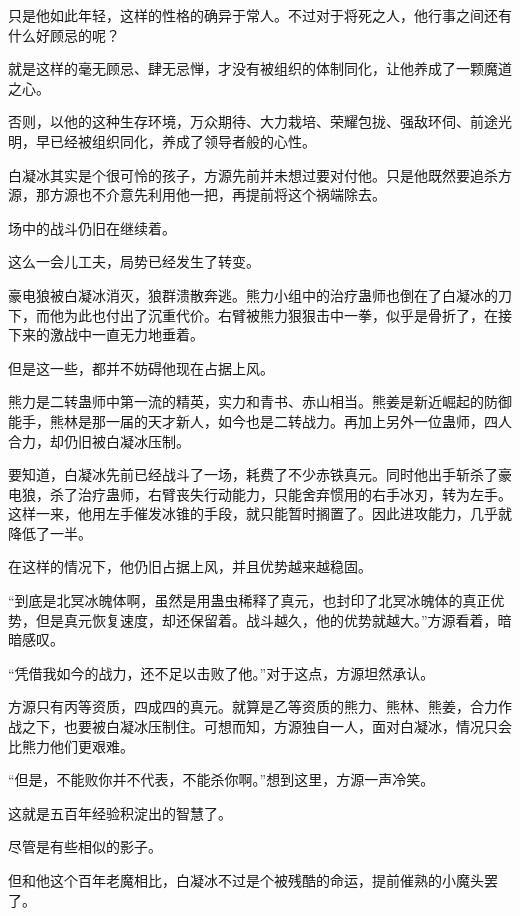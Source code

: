\begin{this_body}
只是他如此年轻，这样的性格的确异于常人。不过对于将死之人，他行事之间还有什么好顾忌的呢？

就是这样的毫无顾忌、肆无忌惮，才没有被组织的体制同化，让他养成了一颗魔道之心。

否则，以他的这种生存环境，万众期待、大力栽培、荣耀包拢、强敌环伺、前途光明，早已经被组织同化，养成了领导者般的心性。

白凝冰其实是个很可怜的孩子，方源先前并未想过要对付他。只是他既然要追杀方源，那方源也不介意先利用他一把，再提前将这个祸端除去。

场中的战斗仍旧在继续着。

这么一会儿工夫，局势已经发生了转变。

豪电狼被白凝冰消灭，狼群溃散奔逃。熊力小组中的治疗蛊师也倒在了白凝冰的刀下，而他为此也付出了沉重代价。右臂被熊力狠狠击中一拳，似乎是骨折了，在接下来的激战中一直无力地垂着。

但是这一些，都并不妨碍他现在占据上风。

熊力是二转蛊师中第一流的精英，实力和青书、赤山相当。熊姜是新近崛起的防御能手，熊林是那一届的天才新人，如今也是二转战力。再加上另外一位蛊师，四人合力，却仍旧被白凝冰压制。

要知道，白凝冰先前已经战斗了一场，耗费了不少赤铁真元。同时他出手斩杀了豪电狼，杀了治疗蛊师，右臂丧失行动能力，只能舍弃惯用的右手冰刃，转为左手。这样一来，他用左手催发冰锥的手段，就只能暂时搁置了。因此进攻能力，几乎就降低了一半。

在这样的情况下，他仍旧占据上风，并且优势越来越稳固。

“到底是北冥冰魄体啊，虽然是用蛊虫稀释了真元，也封印了北冥冰魄体的真正优势，但是真元恢复速度，却还保留着。战斗越久，他的优势就越大。”方源看着，暗暗感叹。

“凭借我如今的战力，还不足以击败了他。”对于这点，方源坦然承认。

方源只有丙等资质，四成四的真元。就算是乙等资质的熊力、熊林、熊姜，合力作战之下，也要被白凝冰压制住。可想而知，方源独自一人，面对白凝冰，情况只会比熊力他们更艰难。

“但是，不能败你并不代表，不能杀你啊。”想到这里，方源一声冷笑。

这就是五百年经验积淀出的智慧了。

尽管是有些相似的影子。

但和他这个百年老魔相比，白凝冰不过是个被残酷的命运，提前催熟的小魔头罢了。

\end{this_body}

